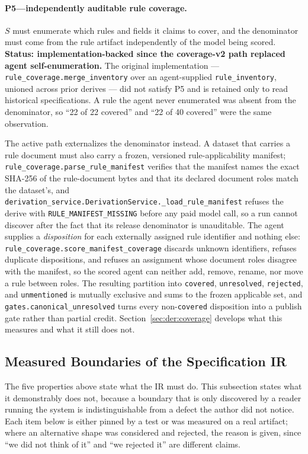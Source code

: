 \paragraph{P5---independently auditable rule coverage.}
$S$ must enumerate which rules and fields it claims to cover, and the denominator must
come from the rule artifact independently of the model being scored. \textbf{Status:
implementation-backed since the coverage-v2 path replaced agent self-enumeration.} The
original implementation --- \texttt{rule\_coverage.merge\_inventory} over an agent-supplied
\texttt{rule\_inventory}, unioned across prior derives --- did not satisfy P5 and is
retained only to read historical specifications. A rule the agent never enumerated was
absent from the denominator, so ``22 of 22 covered'' and ``22 of 40 covered'' were the
same observation.

The active path externalizes the denominator instead. A dataset that carries a rule
document must also carry a frozen, versioned rule-applicability manifest;
\texttt{rule\_coverage.parse\_rule\_manifest} verifies that the manifest names the exact
SHA-256 of the rule-document bytes and that its declared document roles match the
dataset's, and \texttt{derivation\_service.DerivationService.\_load\_rule\_manifest}
refuses the derive with \texttt{RULE\_MANIFEST\_MISSING} before any paid model call, so a
run cannot discover after the fact that its release denominator is unauditable. The agent
supplies a \emph{disposition} for each externally assigned rule identifier and nothing
else: \texttt{rule\_coverage.score\_manifest\_coverage} discards unknown identifiers,
refuses duplicate dispositions, and refuses an assignment whose document roles disagree
with the manifest, so the scored agent can neither add, remove, rename, nor move a rule
between roles. The resulting partition into \texttt{covered}, \texttt{unresolved},
\texttt{rejected}, and \texttt{unmentioned} is mutually exclusive and sums to the frozen
applicable set, and \texttt{gates.canonical\_unresolved} turns every non-\texttt{covered}
disposition into a publish gate rather than partial credit. Section~\ref{sec:der:coverage}
develops what this measures and what it still does not.
\subsection{Measured Boundaries of the Specification IR}
\label{sec:design:boundaries}

The five properties above state what the IR must do. This subsection states what it
demonstrably does not, because a boundary that is only discovered by a reader running the
system is indistinguishable from a defect the author did not notice. Each item below is
either pinned by a test or was measured on a real artifact; where an alternative shape was
considered and rejected, the reason is given, since ``we did not think of it'' and ``we
rejected it'' are different claims.

